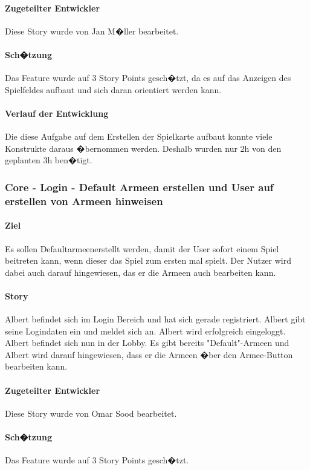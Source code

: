 \documentclass[12pt, titlepage]{scrartcl}
\begin{document}
			\paragraph{Zugeteilter Entwickler} Diese Story wurde von Jan M�ller bearbeitet.
			\paragraph{Sch�tzung}
			Das Feature wurde auf 3 Story Points gesch�tzt, da es auf das Anzeigen des Spielfeldes aufbaut und sich daran orientiert werden kann.
			\paragraph{Verlauf der Entwicklung} 
			Die diese Aufgabe auf dem Erstellen der Spielkarte aufbaut konnte viele Konstrukte daraus �bernommen werden. Deshalb wurden nur 2h von den geplanten 3h ben�tigt.
			
			\subsubsection{Core - Login - Default Armeen erstellen und User auf erstellen von Armeen hinweisen}
			\paragraph{Ziel} Es sollen \glqq Defaultarmeen\grqq erstellt werden, damit der User sofort einem Spiel beitreten kann, wenn dieser das Spiel zum ersten mal spielt. Der Nutzer wird dabei auch darauf hingewiesen, das er die Armeen auch bearbeiten kann.
			\paragraph{Story} Albert befindet sich im Login Bereich und hat sich gerade registriert. Albert gibt seine Logindaten ein und meldet sich an. Albert wird erfolgreich eingeloggt. Albert befindet sich nun in der Lobby. Es gibt bereits  "Default"-Armeen und Albert wird darauf hingewiesen, dass er die Armeen �ber den Armee-Button bearbeiten kann.
			\paragraph{Zugeteilter Entwickler} Diese Story wurde von Omar Sood bearbeitet.
			\paragraph{Sch�tzung}
			Das Feature wurde auf 3 Story Points gesch�tzt.
\end{document}
